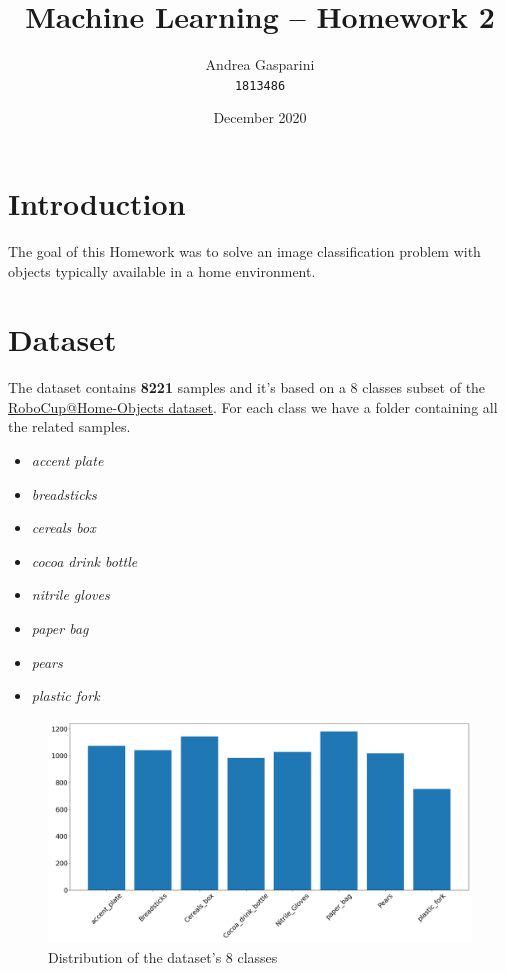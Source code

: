 \documentclass[11pt]{article}
\title{Machine Learning -- Homework 2}
\author{Andrea Gasparini \\ \texttt{1813486}}
\date{December 2020}
\begin{document}
	\maketitle
	\tableofcontents
	\newpage

	\section{Introduction}
	The goal of this Homework was to solve an image classification problem with
	objects typically available in a home environment.



	\section{Dataset}
	The dataset contains \textbf{8221} samples and it's based on a 8 classes subset of the
	\href{https://sites.google.com/diag.uniroma1.it/robocupathome-objects/home}{RoboCup@Home-Objects dataset}.
	For each class we have a folder containing all the related samples.

	\begin{multicols}{2}
		\begin{itemize}
			\item \textit{accent plate}
			\item \textit{breadsticks}
			\item \textit{cereals box}
			\item \textit{cocoa drink bottle}
			\item \textit{nitrile gloves}
			\item \textit{paper bag}
			\item \textit{pears}
			\item \textit{plastic fork}
		\end{itemize}
	\end{multicols}	

	\begin{figure}[H]
		\centering
		\includegraphics[width=\textwidth]{assets/dataset.png}
		\caption{Distribution of the dataset's 8 classes}
		\label{fig:dataset-distribution}
	\end{figure}
\end{document}
